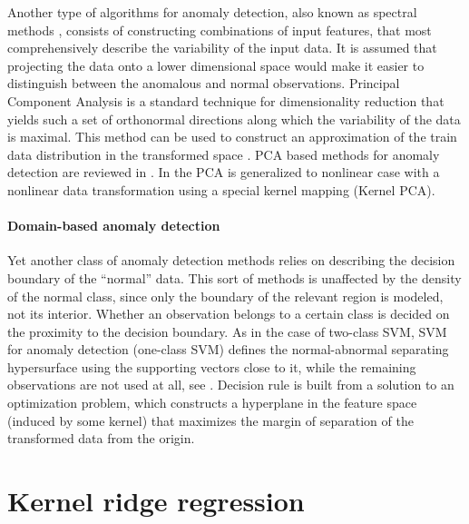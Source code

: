\documentclass[a4paper,14pt]{extarticle}
\begin{document}
Another type of algorithms for anomaly detection, also known as spectral methods
\cite{chandola2009}, consists of constructing combinations of input features, that
most comprehensively describe the variability of the input data. It is assumed that
projecting the data onto a lower dimensional space would make it easier to distinguish
between the anomalous and normal observations. Principal Component Analysis is a
standard technique for dimensionality reduction that yields such a set of orthonormal
directions along which the variability of the data is maximal. This method can be
used to construct an approximation of the train data distribution in the transformed
space \cite{jolliffe2014}. PCA based methods for anomaly detection are reviewed in
\cite{dutta2007,shyu2003}. In \cite{hoffmann2007,scholkopf1998} the PCA is generalized
to nonlinear case with a nonlinear data transformation using a special kernel mapping
(Kernel PCA).


\paragraph{Domain-based anomaly detection} %
\label{par:domain_based_anomaly_detection}

Yet another class of anomaly detection methods relies on describing the decision
boundary of the ``normal'' data. This sort of methods is unaffected by the density
of the normal class, since only the boundary of the relevant region is modeled, not
its interior. Whether an observation belongs to a certain class is decided on the
proximity to the decision boundary. As in the case of two-class SVM, SVM for anomaly
detection (one-class SVM) defines the normal-abnormal separating hypersurface using
the supporting vectors close to it, while the remaining observations are not used
at all, see \cite{scholkopf1999,tax1999,manevitz2002}. Decision rule is built from
a solution to an optimization problem, which constructs a hyperplane in the feature
space (induced by some kernel) that maximizes the margin of separation of the transformed
data from the origin.



\section{Kernel ridge regression} %
\label{sec:kernel_ridge_regression}
\end{document}
